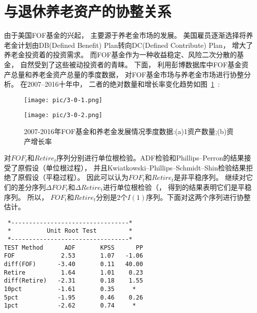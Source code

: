 

\section{与退休养老资产的协整关系}
由于美国FOF基金的兴起， 主要源于养老金市场的发展。 美国雇员逐渐选择将养老金计划由DB(Defined Benefit) Plan转向DC(Defined Contribute) Plan， 增大了养老金投资着的投资需求。 而FOF基金作为一种收益稳定、风险二次分散的基金， 自然受到了这些被动投资者的青睐。 下面， 利用彭博数据库中FOF基金资产总量和养老金资产总量的季度数据， 对FOF基金市场与养老金市场进行协整分析。 在2007--2016十年中， 二者的绝对数量和增长率变化趋势如图~\ref{pic:3-0}~:



\begin{figure}[h!]
	\begin{minipage}[ht]{0.47\textwidth}
		\centering
		\texttt{[image: pic/3-0-1.png]}
		\subcaption{}\label{pic/3-0-1.png}
	\end{minipage}%
	\hspace{0.06\textwidth}
	\begin{minipage}[ht]{0.47\textwidth}
		\centering
		\texttt{[image: pic/3-0-2.png]}
		\subcaption{}\label{pic/3-0-2.png}
	\end{minipage}
	\caption{2007-2016年FOF基金和养老金发展情况季度数据:(a)1资产数量;(b)资产增长率} \label{pic:3-0}
\end{figure}





对${FOF_t}$和${Retire_t}$序列分别进行单位根检验。ADF检验和Phillips–Perron的结果接受了原假设（单位根过程）， 并且Kwiatkowski–Phillips–Schmidt–Shin检验结果拒绝了原假设（平稳过程）。 因此可以认为${FOF_t}$和${Retire_t}$是非平稳序列。
继续对它们的差分序列${\Delta FOF_t}$和${\Delta Retire_t}$进行单位根检验（， 得到的结果表明它们是平稳序列。 所以， ${FOF_t}$和${Retire_t}$分别是2个$I(1)$序列。下面对这两个序列进行协整估计。

\begin{framed}
\begin{verbatim}
 *---------------------------------*                         
 *          Unit Root Test         *                           
 *---------------------------------*
TEST Method      ADF       KPSS      PP  
FOF             2.53       1.07   -1.06
diff(FOF)      -3.40       0.11   40.00
Retire          1.64       1.01    0.23
diff(Retire)   -2.31       0.18    1.55
10pct          -1.61       0.35     *  
5pct           -1.95       0.46    0.26
1pct           -2.62       0.74     *  
\end{verbatim}
\end{framed}


